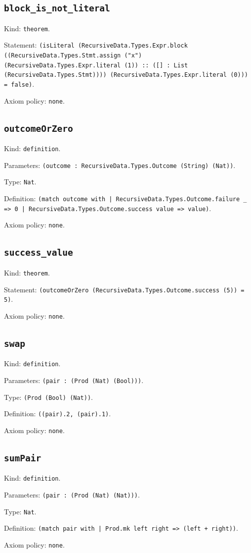 \documentclass[11pt]{article}
\begin{document}
\subsection*{\texttt{block\_is\_not\_literal}}
\noindent Kind: \texttt{theorem}.\par
\noindent Statement: \texttt{(isLiteral (RecursiveData.Types.Expr.block ((RecursiveData.Types.Stmt.assign ("x") (RecursiveData.Types.Expr.literal (1)) :: ([] : List (RecursiveData.Types.Stmt)))) (RecursiveData.Types.Expr.literal (0))) = false)}.\par
\noindent Axiom policy: \texttt{none}.\par
\subsection*{\texttt{outcomeOrZero}}
\noindent Kind: \texttt{definition}.\par
\noindent Parameters: \texttt{(outcome : RecursiveData.Types.Outcome (String) (Nat))}.\par
\noindent Type: \texttt{Nat}.\par
\noindent Definition: \texttt{(match outcome with | RecursiveData.Types.Outcome.failure \_ => 0 | RecursiveData.Types.Outcome.success value => value)}.\par
\noindent Axiom policy: \texttt{none}.\par
\subsection*{\texttt{success\_value}}
\noindent Kind: \texttt{theorem}.\par
\noindent Statement: \texttt{(outcomeOrZero (RecursiveData.Types.Outcome.success (5)) = 5)}.\par
\noindent Axiom policy: \texttt{none}.\par
\subsection*{\texttt{swap}}
\noindent Kind: \texttt{definition}.\par
\noindent Parameters: \texttt{(pair : (Prod (Nat) (Bool)))}.\par
\noindent Type: \texttt{(Prod (Bool) (Nat))}.\par
\noindent Definition: \texttt{((pair).2, (pair).1)}.\par
\noindent Axiom policy: \texttt{none}.\par
\subsection*{\texttt{sumPair}}
\noindent Kind: \texttt{definition}.\par
\noindent Parameters: \texttt{(pair : (Prod (Nat) (Nat)))}.\par
\noindent Type: \texttt{Nat}.\par
\noindent Definition: \texttt{(match pair with | Prod.mk left right => (left + right))}.\par
\noindent Axiom policy: \texttt{none}.\par
\end{document}
